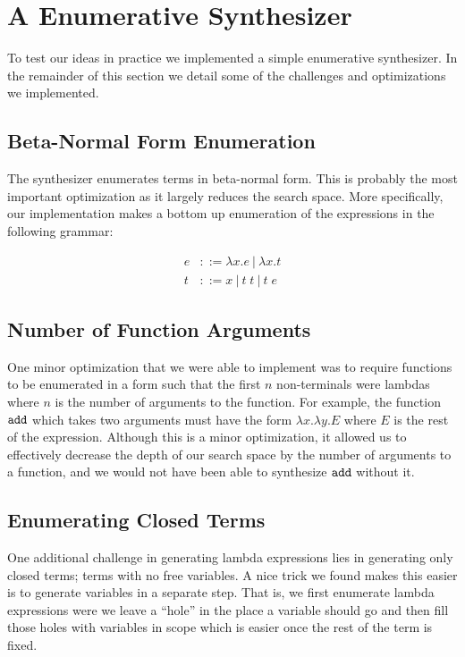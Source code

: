 \section{A Enumerative Synthesizer} \label{sec:optimizations}
%
To test our ideas in practice we implemented a simple
enumerative synthesizer.
%
In the remainder of this section we detail some of the
challenges and optimizations we implemented.

\subsection{Beta-Normal Form Enumeration}
%
The synthesizer enumerates terms in beta-normal form.
%
This is probably the most important optimization as it
largely reduces the search space.
%
More specifically, our implementation makes a bottom up
enumeration of the expressions in the following grammar:

\begin{align*}
  e & ::= \lambda x. e ~|~ \lambda x. t \\
  t & ::= x ~|~ t\;t ~|~ t\;e
\end{align*}

\subsection{Number of Function Arguments}
One minor optimization that we were able to implement was to require
  functions to be enumerated in a form such that the first $n$ non-terminals
  were lambdas where $n$ is the number of arguments to the function.
For example, the function $\texttt{add}$ which takes two arguments must have the
  form $\lambda x. \lambda y. E$ where $E$ is the rest of the expression.
Although this is a minor optimization, it allowed us to effectively decrease
  the depth of our search space by the number of arguments to a function, and
  we would not have been able to synthesize $\texttt{add}$ without it.

\subsection{Enumerating Closed Terms}
%
One additional challenge in generating lambda expressions
lies in generating only closed terms; terms with no free
variables.
%
A nice trick we found makes this easier is to generate
variables in a separate step.
%
That is, we first enumerate lambda expressions were we leave
a ``hole'' in the place a variable should go and then fill
those holes with variables in scope which is easier once the
rest of the term is fixed.


